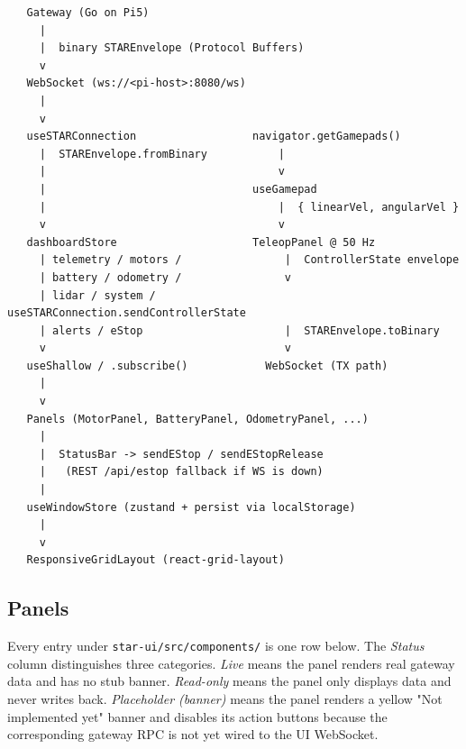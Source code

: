 \begin{center}
\begin{verbatim}
   Gateway (Go on Pi5)
     |
     |  binary STAREnvelope (Protocol Buffers)
     v
   WebSocket (ws://<pi-host>:8080/ws)
     |
     v
   useSTARConnection                  navigator.getGamepads()
     |  STAREnvelope.fromBinary           |
     |                                    v
     |                                useGamepad
     |                                    |  { linearVel, angularVel }
     v                                    v
   dashboardStore                     TeleopPanel @ 50 Hz
     | telemetry / motors /                |  ControllerState envelope
     | battery / odometry /                v
     | lidar / system /                useSTARConnection.sendControllerState
     | alerts / eStop                      |  STAREnvelope.toBinary
     v                                     v
   useShallow / .subscribe()            WebSocket (TX path)
     |
     v
   Panels (MotorPanel, BatteryPanel, OdometryPanel, ...)
     |
     |  StatusBar -> sendEStop / sendEStopRelease
     |   (REST /api/estop fallback if WS is down)
     |
   useWindowStore (zustand + persist via localStorage)
     |
     v
   ResponsiveGridLayout (react-grid-layout)
\end{verbatim}
\end{center}

\subsection{Panels}

Every entry under \texttt{star-ui/src/components/} is one row below.
The \emph{Status} column distinguishes three categories. \emph{Live}
means the panel renders real gateway data and has no stub banner.
\emph{Read-only} means the panel only displays data and never writes
back. \emph{Placeholder (banner)} means the panel renders a yellow
"Not implemented yet" banner and disables its action buttons because
the corresponding gateway RPC is not yet wired to the UI WebSocket.

